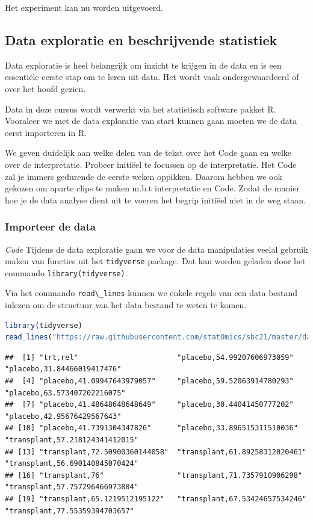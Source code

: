 \documentclass[
  12pt,dutch,coursenotes]{book}
\newcommand{\passthrough}[1]{#1}
\theoremstyle{definition}
\theoremstyle{definition}
\theoremstyle{definition}
\theoremstyle{definition}
\theoremstyle{remark}
\begin{document}
Het experiment kan nu worden uitgevoerd.

\hypertarget{data-exploratie-en-beschrijvende-statistiek}{%
\subsection{Data exploratie en beschrijvende statistiek}\label{data-exploratie-en-beschrijvende-statistiek}}

Data exploratie is heel belangrijk om inzicht te krijgen in de data en is een essentiële eerste stap om te leren uit data.
Het wordt vaak ondergewaardeerd of over het hoofd gezien.

Data in deze cursus wordt verwerkt via het statistisch software pakket R.
Vooraleer we met de data exploratie van start kunnen gaan moeten we de data eerst importeren in R.

We geven duidelijk aan welke delen van de tekst over het Code gaan en welke over de interpretatie. Probeer initiëel te focussen op de interpretatie. Het Code zal je immers gedurende de eerste weken oppikken. Daarom hebben we ook gekozen om aparte clips te maken m.b.t interpretatie en Code. Zodat de manier hoe je de data analyse dient uit te voeren het begrip initiëel niet in de weg staan.

\hypertarget{importeer-de-data}{%
\subsubsection{Importeer de data}\label{importeer-de-data}}

\emph{Code} Tijdens de data exploratie gaan we voor de data manipulaties veelal gebruik maken van functies uit het \passthrough{\lstinline!tidyverse!} package.
Dat kan worden geladen door het commando
\passthrough{\lstinline!library(tidyverse)!}.

Via het commando \passthrough{\lstinline!read\_lines!} kunnen we enkele regels van een data bestand inlezen om de structuur van het data bestand te weten te komen.

\begin{lstlisting}[language=R]
library(tidyverse)
read_lines("https://raw.githubusercontent.com/statOmics/sbc21/master/data/armpit.csv")
\end{lstlisting}

\begin{lstlisting}
##  [1] "trt,rel"                       "placebo,54.99207606973059"     "placebo,31.84466019417476"    
##  [4] "placebo,41.09947643979057"     "placebo,59.52063914780293"     "placebo,63.573407202216075"   
##  [7] "placebo,41.48648648648649"     "placebo,30.44041450777202"     "placebo,42.95676429567643"    
## [10] "placebo,41.7391304347826"      "placebo,33.896515311510036"    "transplant,57.218124341412015"
## [13] "transplant,72.50900360144058"  "transplant,61.89258312020461"  "transplant,56.690140845070424"
## [16] "transplant,76"                 "transplant,71.7357910906298"   "transplant,57.757296466973884"
## [19] "transplant,65.1219512195122"   "transplant,67.53424657534246"  "transplant,77.55359394703657"
\end{lstlisting}
\end{document}
